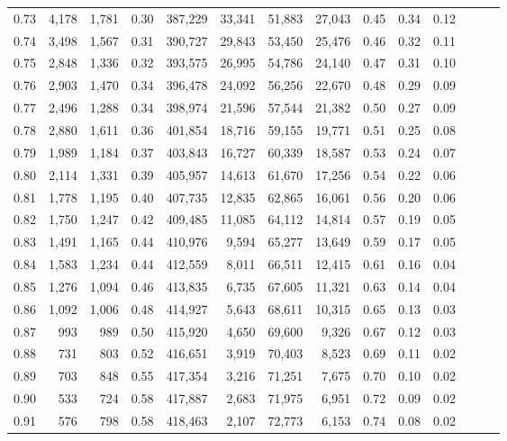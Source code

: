 \begin{tabular}{rrrrrrrrrrrrrr}
0.73 &  4,178 &  1,781 &  0.30 &  387,229 &   33,341 &  51,883 &  27,043 &  0.45 &  0.34 &      0.12 \\
0.74 &  3,498 &  1,567 &  0.31 &  390,727 &   29,843 &  53,450 &  25,476 &  0.46 &  0.32 &      0.11 \\
0.75 &  2,848 &  1,336 &  0.32 &  393,575 &   26,995 &  54,786 &  24,140 &  0.47 &  0.31 &      0.10 \\
0.76 &  2,903 &  1,470 &  0.34 &  396,478 &   24,092 &  56,256 &  22,670 &  0.48 &  0.29 &      0.09 \\
0.77 &  2,496 &  1,288 &  0.34 &  398,974 &   21,596 &  57,544 &  21,382 &  0.50 &  0.27 &      0.09 \\
0.78 &  2,880 &  1,611 &  0.36 &  401,854 &   18,716 &  59,155 &  19,771 &  0.51 &  0.25 &      0.08 \\
0.79 &  1,989 &  1,184 &  0.37 &  403,843 &   16,727 &  60,339 &  18,587 &  0.53 &  0.24 &      0.07 \\
0.80 &  2,114 &  1,331 &  0.39 &  405,957 &   14,613 &  61,670 &  17,256 &  0.54 &  0.22 &      0.06 \\
0.81 &  1,778 &  1,195 &  0.40 &  407,735 &   12,835 &  62,865 &  16,061 &  0.56 &  0.20 &      0.06 \\
0.82 &  1,750 &  1,247 &  0.42 &  409,485 &   11,085 &  64,112 &  14,814 &  0.57 &  0.19 &      0.05 \\
0.83 &  1,491 &  1,165 &  0.44 &  410,976 &    9,594 &  65,277 &  13,649 &  0.59 &  0.17 &      0.05 \\
0.84 &  1,583 &  1,234 &  0.44 &  412,559 &    8,011 &  66,511 &  12,415 &  0.61 &  0.16 &      0.04 \\
0.85 &  1,276 &  1,094 &  0.46 &  413,835 &    6,735 &  67,605 &  11,321 &  0.63 &  0.14 &      0.04 \\
0.86 &  1,092 &  1,006 &  0.48 &  414,927 &    5,643 &  68,611 &  10,315 &  0.65 &  0.13 &      0.03 \\
0.87 &    993 &    989 &  0.50 &  415,920 &    4,650 &  69,600 &   9,326 &  0.67 &  0.12 &      0.03 \\
0.88 &    731 &    803 &  0.52 &  416,651 &    3,919 &  70,403 &   8,523 &  0.69 &  0.11 &      0.02 \\
0.89 &    703 &    848 &  0.55 &  417,354 &    3,216 &  71,251 &   7,675 &  0.70 &  0.10 &      0.02 \\
0.90 &    533 &    724 &  0.58 &  417,887 &    2,683 &  71,975 &   6,951 &  0.72 &  0.09 &      0.02 \\
0.91 &    576 &    798 &  0.58 &  418,463 &    2,107 &  72,773 &   6,153 &  0.74 &  0.08 &      0.02 \\

\end{tabular}
